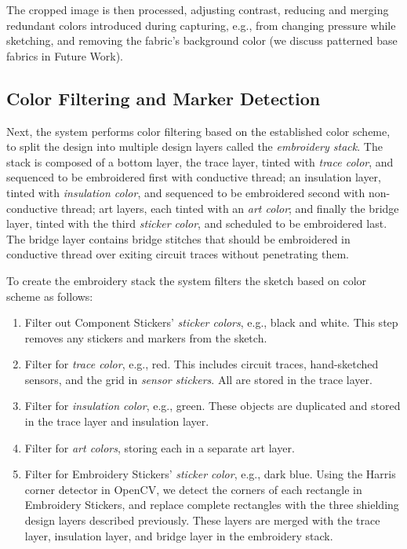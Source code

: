 The cropped image is then processed, adjusting contrast, reducing and merging redundant colors introduced during capturing, e.g., from changing pressure while sketching, and removing the fabric's background color (we discuss patterned base fabrics in Future Work).




\subsection{Color Filtering and Marker Detection}
Next, the system performs color filtering based on the established color scheme, to split the design into multiple design layers called the \emph{embroidery stack}. The stack is composed of a bottom layer, the trace layer, tinted with \textit{trace color}, and sequenced to be embroidered first with conductive thread; an insulation layer, tinted with \textit{insulation color}, and sequenced to be embroidered second with non-conductive thread; art layers, each tinted with an \textit{art color}; and finally the bridge layer, tinted with the third \textit{sticker color}, and scheduled to be embroidered last. The bridge layer contains bridge stitches that should be embroidered in conductive thread over exiting circuit traces without penetrating them.

To create the embroidery stack the system filters the sketch based on color scheme as follows: 
\begin{enumerate}
    \item Filter out Component Stickers' \textit{sticker colors}, e.g., black and white. This step removes any stickers and markers from the sketch. %
    \item Filter for \textit{trace color}, e.g., red. This includes circuit traces, hand-sketched sensors, and the grid in \textit{sensor stickers}. All are stored in the trace layer.
    \item Filter for \textit{insulation color}, e.g., green. These objects are duplicated and stored in the trace layer and insulation layer.
    \item Filter for \textit{art colors}, storing each in a separate art layer.
    \item Filter for Embroidery Stickers' \textit{sticker color}, e.g., dark blue. Using the Harris corner detector in OpenCV, we detect the corners of each rectangle in Embroidery Stickers, and replace complete rectangles with the three shielding design layers described previously. These layers are merged with the trace layer, insulation layer, and bridge layer in the embroidery stack.
\end{enumerate}
 

